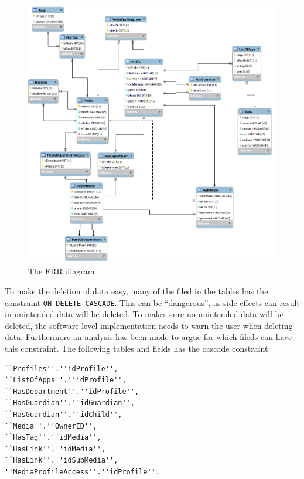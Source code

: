 \begin{figure}
	\centering
		\includegraphics[width=1.00\textwidth]{images/workbenchRight.png}
	\caption{The ERR diagram}
	\label{fig:workbenchRight}
\end{figure}


To make the deletion of data easy, many of the filed in the tables has the constraint \verb+ON DELETE CASCADE+. This can be ``dangerous'', as side-effects can result in unintended data will be deleted. To makes sure no unintended data will be deleted, the software level implementation needs to warn the user when deleting data. Furthermore an analysis has been made to argue for which fileds can have this constraint. The following tables and fields has the cascade constraint: 
\begin{verbatim}
``Profiles''.''idProfile'', 
``ListOfApps''.''idProfile'', 
``HasDepartment''.''idProfile'', 
``HasGuardian''.''idGuardian'', 
``HasGuardian''.''idChild'', 
``Media''.''OwnerID'', 
``HasTag''.''idMedia'', 
``HasLink''.''idMedia'', 
``HasLink''.''idSubMedia'',
''MediaProfileAccess''.''idProfile''.
\end{verbatim}

